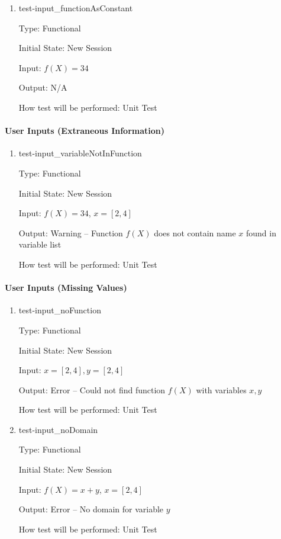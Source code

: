 \documentclass[12pt, titlepage]{article}
\begin{document}
\begin{enumerate}	
	\item{test-input\_functionAsConstant}
	
	Type: Functional
	
	Initial State: New Session
	
	Input: $f(X) = 34$
	
	Output: N/A
	
	How test will be performed: Unit Test\\
\end{enumerate}
	
\paragraph{User Inputs (Extraneous Information)}
	
\begin{enumerate}
	\item{test-input\_variableNotInFunction}
	
	Type: Functional
	
	Initial State: New Session
	
	Input: $f(X) = 34$, $x = [2,4]$
	
	Output: Warning -- Function $f(X)$ does not contain name $x$ found in 
	variable list
	
	How test will be performed: Unit Test\\
	
\end{enumerate}
		
\paragraph{User Inputs (Missing Values)}

\begin{enumerate}

\item{test-input\_noFunction}

Type: Functional

Initial State: New Session

Input: $x = [2,4], y = [2,4]$

Output: Error -- Could not find function $f(X)$ with variables $x, y$

How test will be performed: Unit Test\\

\item{test-input\_noDomain}

Type: Functional
					
Initial State: New Session
					
Input: $f(X) = x + y$, $x = [2,4]$
					
Output: Error -- No domain for variable $y$
					
How test will be performed: Unit Test\\

\end{enumerate}
\end{document}
